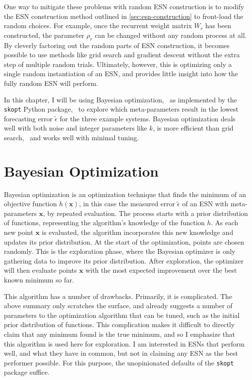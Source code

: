 One way to mitigate these problems with random ESN construction
is to modify the ESN construction method outlined in
\cref{sec:esn-construction} to front-load the random choices. For
example, once the recurrent weight matrix $W_r$ has been constructed,
the parameter $\rho_r$ can be changed without any random process at
all. By cleverly factoring out the random parts of ESN construction,
it becomes possible to use methods like grid search and gradient
descent without the extra step of multiple random trials. Ultimately,
however, this is optimizing only a single random instantiation of an
ESN, and provides little insight into how the fully random ESN will
perform.

In this chapter, I will be using Bayesian
optimization,~\cite{yperman2016,maat2018} as implemented by the
\texttt{skopt} Python package,~\cite{skopt2018} to explore which
meta-parameters result in the lowest forecasting error
$\tilde{\epsilon}$ for the three example systems. Bayesian
optimization deals well with both noise and integer parameters like
$k$, is more efficient than grid search,~\cite{maat2018} and works well
with minimal tuning.

\section{Bayesian Optimization}

Bayesian optimization is an optimization technique that finds the
minimum of an objective function $h(\bm{x})$, in this case the
measured error $\tilde{\epsilon}$ of an ESN with meta-parameters
$\bm{x}$, by repeated evaluation. The process starts with a prior
distribution of functions, representing the algorithm's knowledge of
the function $h$. As each new point $\bm{x}$ is evaluated, the
algorithm incorporates this new knowledge and updates its prior
distribution. At the start of the optimization, points are chosen
randomly. This is the exploration phase, where the Bayesian optimizer
is only gathering data to improve its prior distribution. After
exploration, the optimizer will then evaluate points $\bm{x}$ with the
most expected improvement over the best known minimum so far.

This algorithm has a number of drawbacks. Primarily, it is
complicated. The above summary only scratches the surface, and already
suggests a number of parameters to the optimization algorithm that can
be tuned, such as the initial prior distribution of functions. This
complication makes it difficult to directly claim that any minimum
found is the true minimum, and so I emphasize that this algorithm is
used here for exploration. I am interested in ESNs that perform well,
and what they have in common, but not in claiming any ESN as the best
performer possible. For this purpose, the unopinionated defaults of
the \texttt{skopt} package suffice.

